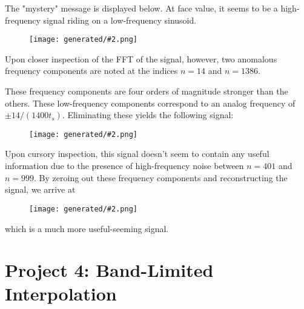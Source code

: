 \documentclass{ajhlabreport}
\newcommand{\generatedfigw}[2]{
	\texttt{[image: generated/\#2.png]}
}
\providecommand{\n}[0]{[n]}
\begin{document}
 The "mystery" message is displayed below. At face value, it seems
to be a high-frequency signal riding on a low-frequency sinusoid.
%
\vspace{-0.1in}
\begin{figure}[H]
\centering
\generatedfigw{0.8}{p3-mystery}
\end{figure}
\vspace{-0.1in}
%
 Upon closer inspection of the FFT of the signal, however, two
anomalous frequency components are noted at the indices $n=14$ and $n=1386$.
%
\vspace{-0.1in}
\begin{figure}[H]
\centering
{}
\end{figure}
\vspace{-0.1in}
%
These frequency components are four orders of magnitude stronger than the
others.  These low-frequency components correspond to an analog
frequency of $\pm 14/(1400 t_s)$. Eliminating these yields the following signal:
%
\begin{figure}[H]
\centering
\generatedfigw{0.8}{p3-mystery-corrected}
\end{figure}
%
Upon cursory inspection, this signal doesn't seem to contain any useful
information due to the presence of high-frequency noise between $n=401$ and
$n=999$.    By zeroing out these frequency
components and reconstructing the signal, we arrive at
%
\begin{figure}[H]
\centering
\generatedfigw{0.8}{p3-mystery-corrected2}
\end{figure}
which is a much more useful-seeming signal.



\newpage
\chapter{Project 4: Band-Limited Interpolation}
\end{document}
